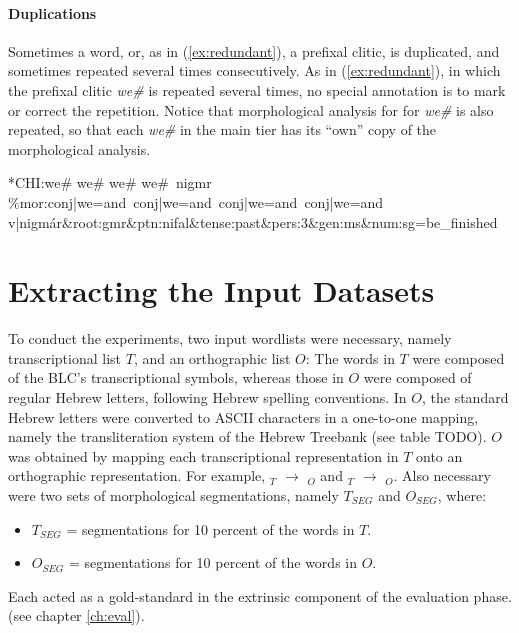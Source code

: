 \paragraph{Duplications}
Sometimes a word, or, as in (\ref{ex:redundant}), a prefixal clitic, 
is duplicated, and sometimes repeated
several times consecutively. As in (\ref{ex:redundant}), in which the prefixal clitic \textit{we\#} is 
repeated several times, no special annotation is to mark or correct the repetition. Notice that morphological analysis for
for \textit{we\#} is also repeated, so that each \textit{we\#} in the main tier has its ``own'' copy of the morphological analysis.
\begin{exe} \label{ex:redundant}
\ex \textsf{*\ac{CH}I:\quad we\# we\# we\# we\#\, nigmr } \\
   \textsf{\%mor:\quad conj|we=and\, conj|we=and\, conj|we=and\, conj|we=and} \\
   \textsf{v|nigm\'ar\&root:gmr\&ptn:nifal\&tense:past\&pers:3\&gen:ms\&num:sg=be\_finished }
\end{exe}

 
\section{Extracting the Input Datasets}\label{sec:extr}
To conduct the experiments, two input wordlists were necessary, 
namely transcriptional list $T$, and an orthographic list $O$:
The words in $T$ were composed of the \ac{BLC}'s transcriptional symbols, 
whereas those in $O$
were composed of regular Hebrew letters, following Hebrew spelling conventions. 
In $O$, the standard Hebrew letters were converted to ASCII characters in a one-to-one
mapping, namely the transliteration system of the Hebrew Treebank 
\citep{simaan-et-al:2001} (see table TODO).
$O$ was obtained by mapping each transcriptional representation 
in $T$ onto an orthographic representation. For example, $_T$ $\to$
$_O$ and $_T$ $\to$ $_O$.
Also necessary were two sets of morphological segmentations, namely $T_{SEG}$ and $O_{SEG}$, where:
\begin{itemize}
\item $T_{SEG}$ = segmentations for 10 percent of the words in $T$.
\item  $O_{SEG}$ = segmentations for 10 percent of the words in $O$.
\end{itemize} 
Each acted as a gold-standard in the extrinsic 
component of the evaluation phase. (see chapter \ref{ch:eval}).  

